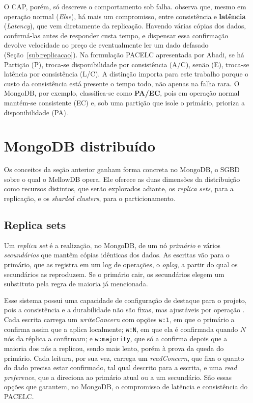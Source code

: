 O CAP, porém, só descreve o comportamento sob falha. \citet{abadi2012} observa que, mesmo em operação normal (\textit{Else}), há mais um compromisso, entre consistência e \textbf{latência} (\textit{Latency}), que vem diretamente da replicação. Havendo várias cópias dos dados, confirmá-las antes de responder custa tempo, e dispensar essa confirmação devolve velocidade ao preço de eventualmente ler um dado defasado (Seção~\ref{sub:replicacao}). Na formulação PACELC apresentada por Abadi, se há Partição (P), troca-se disponibilidade por consistência (A/C), senão (E), troca-se latência por consistência (L/C). A distinção importa para este trabalho porque o custo da consistência está presente o tempo todo, não apenas na falha rara. O MongoDB, por exemplo, classifica-se como \textbf{PA/EC}, pois em operação normal mantém-se consistente (EC) e, sob uma partição que isole o primário, prioriza a disponibilidade (PA).

\section{MongoDB distribuído}
\label{sec:mongodb}

Os conceitos da seção anterior ganham forma concreta no MongoDB, o SGBD sobre o qual o MellowDB opera. Ele oferece as duas dimensões da distribuição como recursos distintos, que serão explorados adiante, os \textit{replica sets}, para a replicação, e os \textit{sharded clusters}, para o particionamento.

\subsection{Replica sets}
\label{sub:replica-sets}

Um \textit{replica set} é a realização, no MongoDB, de um nó \textit{primário} e vários \textit{secundários} que mantêm cópias idênticas dos dados. As escritas vão para o primário, que as registra em um log de operações, o \textit{oplog}, a partir do qual os secundários as reproduzem. Se o primário cair, os secundários elegem um substituto pela regra de maioria já mencionada.

Esse sistema possui uma capacidade de configuração de destaque para o projeto, pois a consistência e a durabilidade não são fixas, mas ajustáveis por operação \citep{schultz2019}. Cada escrita carrega um \textit{writeConcern} com opções \texttt{w:1}, em que o primário a confirma assim que a aplica localmente; \texttt{w:N}, em que ela é confirmada quando $N$ nós da réplica a confirmam; e \texttt{w:majority}, que só a confirma depois que a maioria dos nós a replicou, sendo mais lento, porém à prova da queda do primário. Cada leitura, por sua vez, carrega um \textit{readConcern}, que fixa o quanto do dado precisa estar confirmado, tal qual descrito para a escrita, e uma \textit{read preference}, que a direciona ao primário atual ou a um secundário. São essas opções que garantem, no MongoDB, o compromisso de latência e consistência do PACELC.

